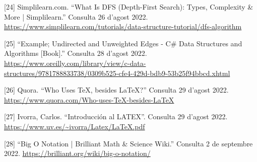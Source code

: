 [24] Simplilearn.com. “What Is DFS (Depth-First Search): Types, Complexity \& More | Simplilearn.” Consulta 26 d'agost 2022. 
\href{https://www.simplilearn.com/tutorials/data-structure-tutorial/dfs-algorithm}{https://www.simplilearn.com/tutorials/data-structure-tutorial/dfs-algorithm}

[25] “Example; Undirected and Unweighted Edges - C\# Data Structures and Algorithms [Book].” Consulta 28 d'agost 2022. \url{ https://www.oreilly.com/library/view/c-data-structures/9781788833738/0309b525-cfe4-429d-bdb9-53b25f94bbcd.xhtml}

[26] Quora. “Who Uses TeX, besides LaTeX?” Consulta 29 d'agost 2022. \url{https://www.quora.com/Who-uses-TeX-besides-LaTeX}

[27] Ivorra, Carlos. “Introducción al LATEX”. Consulta 29 d'agost 2022. \url{https://www.uv.es/~ivorra/Latex/LaTeX.pdf}

[28] “Big O Notation | Brilliant Math \& Science Wiki.” Consulta 2 de septembre 2022. \url{https://brilliant.org/wiki/big-o-notation/}
